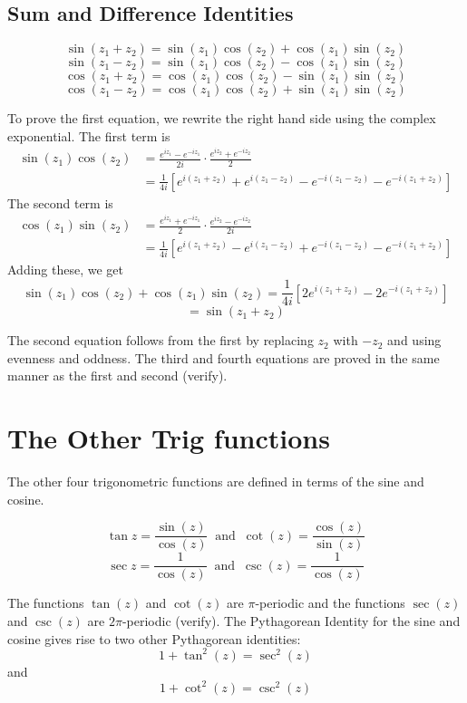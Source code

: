 \documentclass[handout]{ximera}
\begin{document}
\subsection{Sum and Difference Identities}
\begin{proposition}
\[
\sin(z_1 + z_2) = \sin(z_1)\cos(z_2) + \cos(z_1)\sin(z_2)
\]
\[
\sin(z_1 - z_2) = \sin(z_1)\cos(z_2) - \cos(z_1)\sin(z_2)
\]
\[
\cos(z_1 + z_2) = \cos(z_1)\cos(z_2) - \sin(z_1)\sin(z_2)
\]
\[
\cos(z_1 - z_2) = \cos(z_1)\cos(z_2) + \sin(z_1)\sin(z_2)
\]
\end{proposition}
To prove the first equation, we rewrite the right hand side using the complex exponential. The first term is
\begin{align*}
\sin(z_1)\cos(z_2) &= \frac{e^{iz_1} - e^{- iz_1}}{2i} \cdot \frac{e^{iz_2} + e^{-iz_2}}{2}\\
&= \frac{1}{4i}\left[e^{i(z_1+ z_2)} + e^{i(z_1 - z_2)} - e^{-i(z_1 - z_2)} - e^{-i(z_1+ z_2)}\right]
\end{align*}
The second term is
\begin{align*}
\cos(z_1)\sin(z_2) &= \frac{e^{iz_1} + e^{- iz_1}}{2} \cdot \frac{e^{iz_2} - e^{-iz_2}}{2i}\\
&= \frac{1}{4i}\left[e^{i(z_1+ z_2)} - e^{i(z_1 - z_2)} + e^{-i(z_1 - z_2)} - e^{-i(z_1+ z_2)}\right]
\end{align*}
Adding these, we get
\[
\sin(z_1)\cos(z_2) + \cos(z_1)\sin(z_2)  = \frac{1}{4i}\left[2e^{i(z_1+ z_2)} - 2e^{-i(z_1+ z_2)}\right]
\]
\[
= \sin(z_1 + z_2)
\]




The second equation follows from the first by replacing $z_2$ with $-z_2$ and using evenness and oddness.
The third and fourth equations are proved in the same manner as the first and second (verify).


\section{The Other Trig functions}
The other four trigonometric functions are defined in terms of the sine and cosine.

\begin{definition}
\[
\tan z = \frac{\sin(z)}{\cos(z)} \;\; \mbox{and} \;\; \cot(z) = \frac{\cos(z)}{\sin(z)}
\]
\[
\sec z = \frac{1}{\cos(z)} \;\; \mbox{and} \;\; \csc(z) = \frac{1}{\cos(z)}
\]
\end{definition}
The functions $\tan(z)$ and $\cot(z)$ are $\pi$-periodic
and the functions $\sec(z)$ and $\csc(z)$ are $2\pi$-periodic (verify).
The Pythagorean Identity for the sine and cosine gives rise to two other Pythagorean identities:
\[
1+ \tan^2(z) = \sec^2(z)
\]
and
\[
1 + \cot^2(z) = \csc^2(z)
\]
\end{document}
